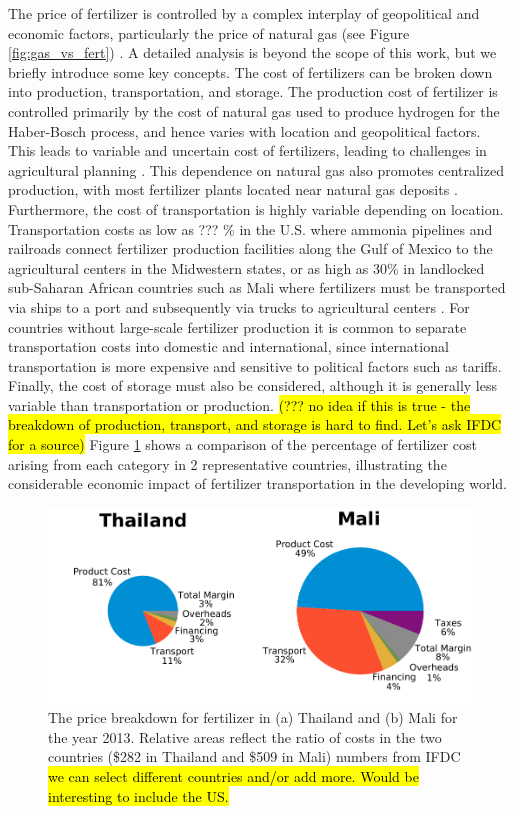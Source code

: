 The price of fertilizer is controlled by a complex interplay of geopolitical and economic factors, particularly the price of natural gas (see Figure \ref{fig:gas_vs_fert}) \needcite. A detailed analysis is beyond the scope of this work, but we briefly introduce some key concepts. The cost of fertilizers can be broken down into production, transportation, and storage. The production cost of fertilizer is controlled primarily by the cost of natural gas used to produce hydrogen for the Haber-Bosch process, and hence varies with location and geopolitical factors. This leads to variable and uncertain cost of fertilizers, leading to challenges in agricultural planning \needcite. This dependence on natural gas also promotes centralized production, with most fertilizer plants located near natural gas deposits \cite{McArthur_2017}. Furthermore, the cost of transportation is highly variable depending on location. Transportation costs as low as ??? \% in the U.S. where ammonia pipelines and railroads connect fertilizer production facilities along the Gulf of Mexico to the agricultural centers in the Midwestern states, or as high as 30\% in landlocked sub-Saharan African countries such as Mali where fertilizers must be transported via ships to a port and subsequently via trucks to agricultural centers \cite{Wanzala2013}. For countries without large-scale fertilizer production it is common to separate transportation costs into domestic and international, since international transportation is more expensive and sensitive to political factors such as tariffs. Finally, the cost of storage must also be considered, although it is generally less variable than transportation or production. \hl{(??? no idea if this is true - the breakdown of production, transport, and storage is hard to find. Let's ask IFDC for a source)} Figure \ref{fig:cost_pies} shows a comparison of the percentage of fertilizer cost arising from each category in 2 representative countries, illustrating the considerable economic impact of fertilizer transportation in the developing world.

\begin{figure}
    \centering
    \includegraphics[width=1\textwidth]{Figures/Cost_Breakdown.pdf}
    \caption{The price breakdown for fertilizer in (a) Thailand and (b) Mali for the year 2013. Relative areas reflect the ratio of costs in the two countries (\$282 in Thailand and  \$509 in Mali) numbers from IFDC\cite{Wanzala2013} \hl{we can select different countries and/or add more. Would be interesting to include the US.}}
    \label{fig:cost_pies}
\end{figure}

